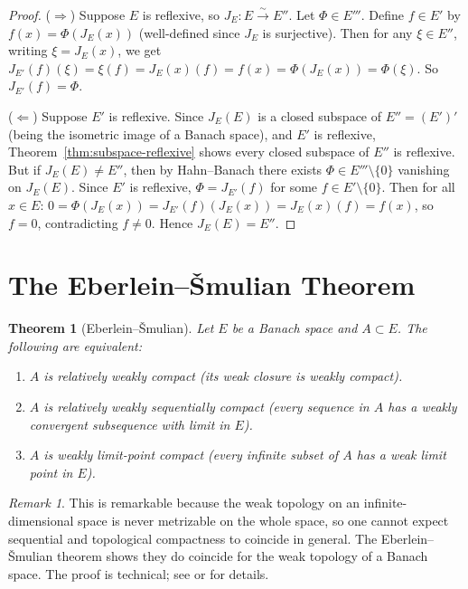 \documentclass[a4paper,12pt]{book}
\theoremstyle{definition}
\theoremstyle{plain}
\newtheorem{theorem}[definition]{Theorem}
\theoremstyle{remark}
\newtheorem{remark}[definition]{Remark}
\begin{document}
\begin{proof}
($\Rightarrow$) Suppose $E$ is reflexive, so $J_E:E\xrightarrow{\sim}E''$.
Let $\Phi\in E'''$.  Define $f\in E'$ by $f(x) = \Phi(J_E(x))$ (well-defined
since $J_E$ is surjective).  Then for any $\xi\in E''$, writing
$\xi = J_E(x)$, we get $J_{E'}(f)(\xi) = \xi(f) = J_E(x)(f) = f(x)
= \Phi(J_E(x)) = \Phi(\xi)$.  So $J_{E'}(f) = \Phi$.

($\Leftarrow$) Suppose $E'$ is reflexive.  Since $J_E(E)$ is a closed subspace
of $E'' = (E')'$ (being the isometric image of a Banach space), and $E'$ is
reflexive, Theorem~\ref{thm:subspace-reflexive} shows every closed subspace
of $E''$ is reflexive.  But if $J_E(E)\ne E''$, then by Hahn--Banach there
exists $\Phi\in E'''\setminus\{0\}$ vanishing on $J_E(E)$.  Since $E'$ is
reflexive, $\Phi = J_{E'}(f)$ for some $f\in E'\setminus\{0\}$.
Then for all $x\in E$:
$0 = \Phi(J_E(x)) = J_{E'}(f)(J_E(x)) = J_E(x)(f) = f(x)$,
so $f=0$, contradicting $f\ne 0$.  Hence $J_E(E)=E''$.
\end{proof}

\section{The Eberlein--\v{S}mulian Theorem}\label{sec:eberlein-smulian}

\begin{theorem}[{Eberlein--\v{S}mulian}]\label{thm:eberlein-smulian}
Let $E$ be a Banach space and $A\subset E$.  The following are equivalent:
\begin{enumerate}[label=(\roman*)]
  \item $A$ is relatively weakly compact (its weak closure is weakly compact).
  \item $A$ is relatively weakly sequentially compact (every sequence in $A$
        has a weakly convergent subsequence with limit in $E$).
  \item $A$ is weakly limit-point compact (every infinite subset of $A$ has
        a weak limit point in $E$).
\end{enumerate}
\end{theorem}

\begin{remark}\label{rem:eberlein-smulian-discussion}
This is remarkable because the weak topology on an infinite-dimensional space
is never metrizable on the whole space, so one cannot expect sequential and
topological compactness to coincide in general.  The Eberlein--\v{S}mulian
theorem shows they do
coincide for the weak topology of a Banach space.  The proof is technical; see
\cite{DunfordSchwartz1958} or \cite{Megginson1998} for details.
\end{remark}
\end{document}

